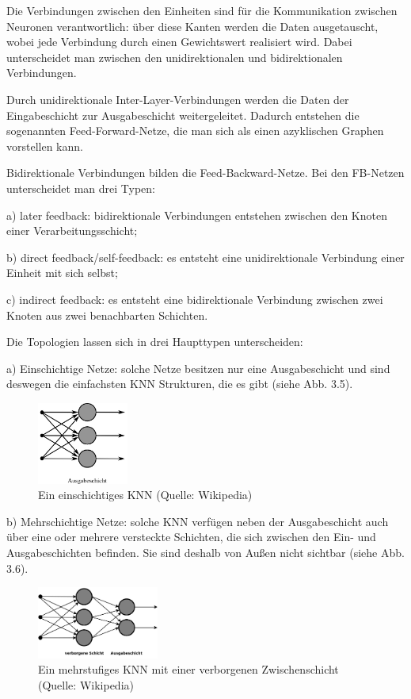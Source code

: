 Die Verbindungen zwischen den Einheiten sind für die Kommunikation zwischen Neuronen verantwortlich: über diese Kanten werden die Daten ausgetauscht, wobei jede Verbindung durch einen Gewichtswert realisiert wird. Dabei unterscheidet man zwischen den unidirektionalen und bidirektionalen Verbindungen.

Durch unidirektionale Inter-Layer-Verbindungen werden die Daten der Eingabeschicht zur Ausgabeschicht weitergeleitet. Dadurch entstehen die sogenannten Feed-Forward-Netze, die man sich als einen azyklischen Graphen vorstellen kann.

Bidirektionale Verbindungen bilden die Feed-Backward-Netze. Bei den FB-Netzen unterscheidet man drei Typen:

a) later feedback: bidirektionale Verbindungen entstehen zwischen den Knoten einer Verarbeitungsschicht;

b) direct feedback/self-feedback: es entsteht eine unidirektionale Verbindung einer Einheit mit sich selbst;

c) indirect feedback: es entsteht eine bidirektionale Verbindung zwischen zwei Knoten aus zwei benachbarten Schichten.

Die Topologien lassen sich in drei Haupttypen unterscheiden:

a) Einschichtige Netze: solche Netze besitzen nur eine Ausgabeschicht und sind deswegen die einfachsten KNN Strukturen, die es gibt (siehe Abb. 3.5).

\begin{figure}[h]
\centering
\includegraphics[width=3cm]{chapters/neural_networks/single.jpg}

\caption{Ein einschichtiges KNN (Quelle: Wikipedia)}
	\label{img:single}
\end{figure}


b) Mehrschichtige Netze: solche KNN verfügen neben der Ausgabeschicht auch über eine oder mehrere versteckte Schichten, die sich zwischen den Ein- und Ausgabeschichten befinden. Sie sind deshalb von Außen nicht sichtbar (siehe Abb. 3.6).

\begin{figure}[h]
\centering
\includegraphics[width=4cm]{chapters/neural_networks/multilayer.jpg}

\caption{Ein mehrstufiges KNN mit einer verborgenen Zwischenschicht (Quelle: Wikipedia)}
	\label{img:multi}
\end{figure}

